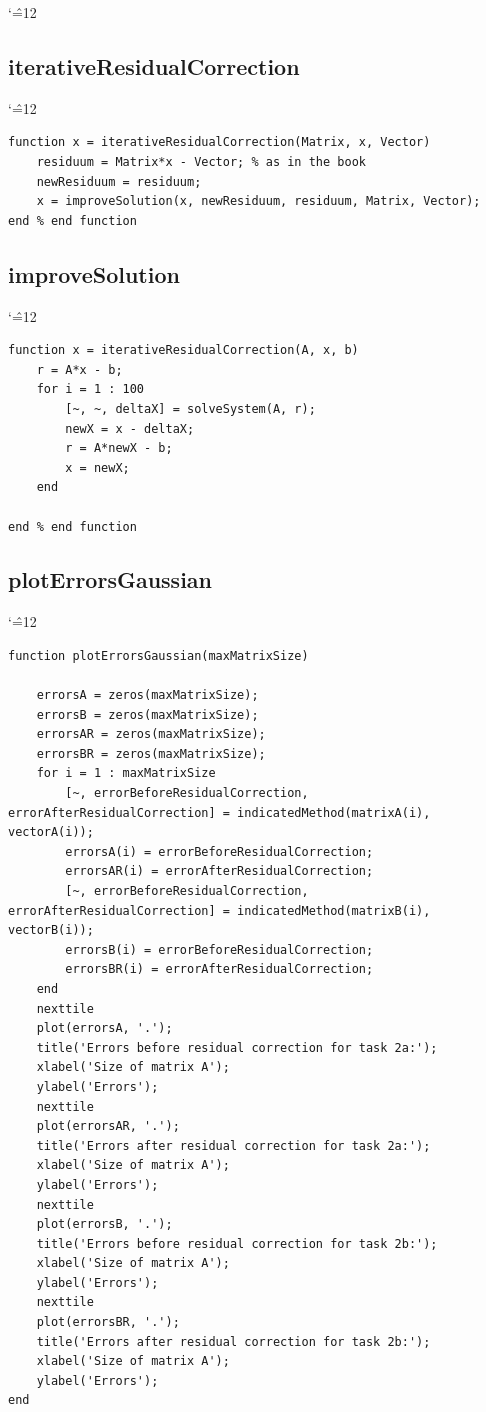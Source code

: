 \documentclass[12pt]{report}
\newenvironment{simplechar}{%
   \catcode`\^=12
}{}
\begin{document}
\begin{simplechar}
\subsection{iterativeResidualCorrection}
\begin{simplechar}
\begin{lstlisting}
function x = iterativeResidualCorrection(Matrix, x, Vector)
    residuum = Matrix*x - Vector; % as in the book
    newResiduum = residuum;
    x = improveSolution(x, newResiduum, residuum, Matrix, Vector);
end % end function
\end{lstlisting}
\end{simplechar}

\newpage
\subsection{improveSolution}
\begin{simplechar}
\begin{lstlisting}
function x = iterativeResidualCorrection(A, x, b)
    r = A*x - b;
    for i = 1 : 100
        [~, ~, deltaX] = solveSystem(A, r);
        newX = x - deltaX;
        r = A*newX - b;
        x = newX;
    end

end % end function

\end{lstlisting}
\end{simplechar}

\newpage
\hypertarget{function2_plot}{\subsection{plotErrorsGaussian}}
\begin{simplechar}
\begin{lstlisting}
function plotErrorsGaussian(maxMatrixSize)

    errorsA = zeros(maxMatrixSize);
    errorsB = zeros(maxMatrixSize);
    errorsAR = zeros(maxMatrixSize);
    errorsBR = zeros(maxMatrixSize);
    for i = 1 : maxMatrixSize
        [~, errorBeforeResidualCorrection, errorAfterResidualCorrection] = indicatedMethod(matrixA(i), vectorA(i));
        errorsA(i) = errorBeforeResidualCorrection;
        errorsAR(i) = errorAfterResidualCorrection;
        [~, errorBeforeResidualCorrection, errorAfterResidualCorrection] = indicatedMethod(matrixB(i), vectorB(i));
        errorsB(i) = errorBeforeResidualCorrection;
        errorsBR(i) = errorAfterResidualCorrection;
    end
    nexttile
    plot(errorsA, '.');
    title('Errors before residual correction for task 2a:');
    xlabel('Size of matrix A');
    ylabel('Errors');
    nexttile
    plot(errorsAR, '.');
    title('Errors after residual correction for task 2a:');
    xlabel('Size of matrix A');
    ylabel('Errors');
    nexttile
    plot(errorsB, '.');
    title('Errors before residual correction for task 2b:');
    xlabel('Size of matrix A');
    ylabel('Errors');
    nexttile
    plot(errorsBR, '.');
    title('Errors after residual correction for task 2b:');
    xlabel('Size of matrix A');
    ylabel('Errors');
end
\end{lstlisting}
\end{simplechar}



\end{simplechar}
\end{document}
